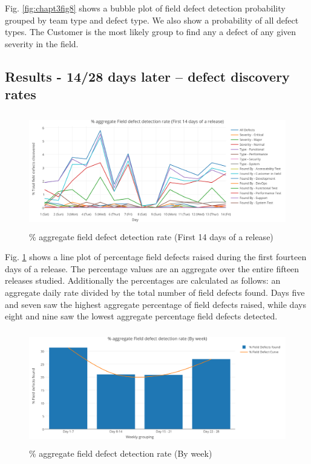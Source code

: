 Fig. \ref{fig:chapt3fig8} shows a bubble plot of field defect detection probability grouped by team type and defect type. We also show a probability of all defect types. The Customer is the most likely group to find any a defect of any given severity in the field.

\subsection{Results - 14/28 days later -- defect discovery rates}

\begin{figure}
\begin{center}
\caption{\% aggregate field defect detection rate (First 14 days of a release)}
\label{fig:chapt3fig9}
\includegraphics[height=5cm, width=14cm]{graphs/dogfood/Graph5.png} 
\end{center}
\end{figure}



Fig. \ref{fig:chapt3fig9} shows a line plot of percentage field defects raised during the first fourteen days of a release. The percentage values are an aggregate over the entire fifteen releases studied. Additionally the percentages are calculated as follows: an aggregate daily rate divided by the total number of field defects found. Days five and seven saw the highest aggregate percentage of field defects raised, while days eight and nine saw the lowest aggregate percentage
field defects detected.

\begin{figure}
\begin{center}
\caption{\% aggregate field defect detection rate (By week)}
\label{fig:chapt3fig10}
\includegraphics[height=5cm, width=12cm]{graphs/dogfood/Graph6.png} 
\end{center}
\end{figure}

